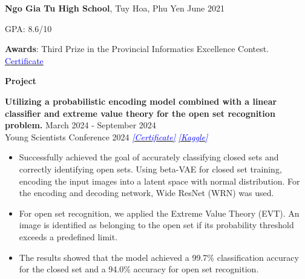 \documentclass[11pt]{article}
\begin{document}
    \vspace{12pt}
    
    \textbf{Ngo Gia Tu High School}, Tuy Hoa, Phu Yen   \hfill June 2021
    
    \hfill GPA: 8.6/10  
    
    \textbf{Awards}: Third Prize in the Provincial Informatics Excellence Contest.
    \hfill 
    \href{https://github.com/taitruong256/Competitive-programming/blob/main/Chung-nhan-giai-Ba-hoc-sinh-gioi-Tin-hoc-tinh-Phu-Yen.jpg}{\textcolor{blue}{Certificate}} 
    
    
    \vspace{12pt}










    





    
    \begin{center}
        \hrulefill
    \end{center}
    \begin{center}
        \textbf{Project}
    \end{center}
    
    \textbf{Utilizing a probabilistic encoding model combined with a linear classifier and extreme value theory for the open set recognition problem.} \hfill March 2024 - September 2024 \\
    Young Scientists Conference 2024
    \hfill \href{https://drive.google.com/file/d/1l1SqZIbdWwFyhkkkd7IVw5bSU6gou24q/view?usp=sharing}{\textcolor{blue}{\textit{[Certificate]}}} \href{https://www.kaggle.com/code/taitruong256/openset-recognization-pytorch}{\textcolor{blue}{\textit{[Kaggle]}}}
    
    \begin{itemize}[noitemsep, topsep=0pt, partopsep=0pt, parsep=0pt]
        
        \item Successfully achieved the goal of accurately classifying closed sets and correctly identifying open sets. Using beta-VAE for closed set training, encoding the input images into a latent space with normal distribution. For the encoding and decoding network, Wide ResNet (WRN) was used.

        \item For open set recognition, we applied the Extreme Value Theory (EVT). An image is identified as belonging to the open set if its probability threshold exceeds a predefined limit.
        
        \item The results showed that the model achieved a 99.7\% classification accuracy for the closed set and a 94.0\% accuracy for open set recognition.
    \end{itemize}
    
\end{document}
